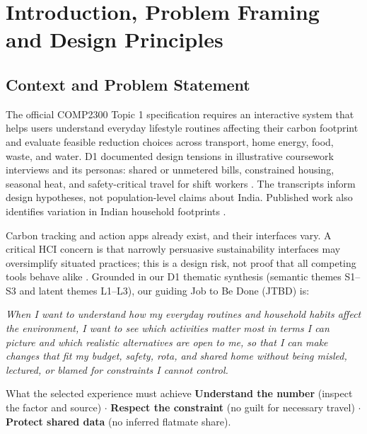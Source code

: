 \documentclass[12pt,a4paper]{article}
\begin{document}
\clearpage
\section{Introduction, Problem Framing and Design Principles}

\subsection{Context and Problem Statement}
The official COMP2300 Topic 1 specification requires an interactive system that helps users understand everyday lifestyle routines affecting their carbon footprint and evaluate feasible reduction choices across transport, home energy, food, waste, and water. D1 documented design tensions in illustrative coursework interviews and its personas: shared or unmetered bills, constrained housing, seasonal heat, and safety-critical travel for shift workers \cite{d1report}. The transcripts inform design hypotheses, not population-level claims about India. Published work also identifies variation in Indian household footprints \cite{lee2021}. 

Carbon tracking and action apps already exist, and their interfaces vary. A critical HCI concern is that narrowly persuasive sustainability interfaces may oversimplify situated practices; this is a design risk, not proof that all competing tools behave alike \cite{brynjarsdottir2012}. Grounded in our D1 thematic synthesis (semantic themes S1--S3 and latent themes L1--L3), our guiding Job to Be Done (JTBD) is:
\begin{jtbox}
\itshape
When I want to understand how my everyday routines and household habits affect the environment, I want to see which activities matter most in terms I can picture and which realistic alternatives are open to me, so that I can make changes that fit my budget, safety, rota, and shared home without being misled, lectured, or blamed for constraints I cannot control.
\end{jtbox}

\begin{chapterfocus}{What the selected experience must achieve}
\textbf{Understand the number} (inspect the factor and source) \quad $\cdot$ \quad
\textbf{Respect the constraint} (no guilt for necessary travel) \quad $\cdot$ \quad
\textbf{Protect shared data} (no inferred flatmate share).
\end{chapterfocus}
\end{document}
